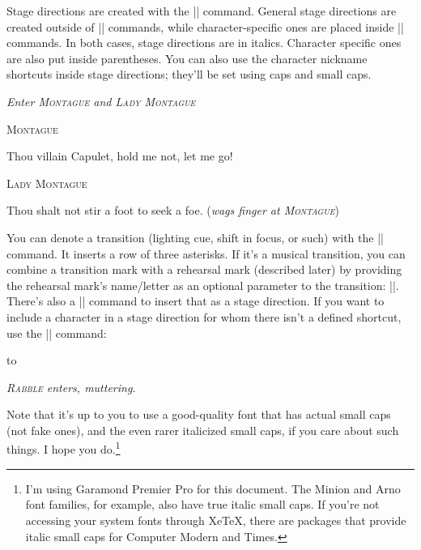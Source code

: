 \documentclass{article}
\let\ital\textit
\begin{document}
Stage directions are created with the |\stdir| command. General stage directions are created outside of |\dialog| commands, while character-specific ones are placed inside |\dialog| commands. In both cases, stage directions are in italics. Character specific ones are also put inside parentheses. You can also use the character nickname shortcuts inside stage directions; they’ll be set using caps and small caps. 

\begin{example}
\end{example}

\noindent\ital{Enter \textsc{Montague} and \textsc{Lady Montague}}

\medskip\centerline{\textsc{Montague}}
\hspace{2em}Thou villain Capulet, hold me not, let me go!

\medskip\centerline{\textsc{Lady Montague}}
\hspace{2em}Thou shalt not stir a foot to seek a foe. (\ital{wags finger at \textsc{Montague}})

\medskip
You can denote a transition (lighting cue, shift in focus, or such) with the |\transition| command. It inserts a row of three asterisks. If it's a musical transition, you can combine a transition mark with a rehearsal mark (described later) by providing the rehearsal mark's name/letter as an optional parameter to the transition: |\transition[G]|. There’s also a |\pause| command to insert that as a stage direction. If you want to include a character in a stage direction for whom there isn’t a defined shortcut, use the |\character| command:
 
\begin{example}
	\transition[D]
\end{example}
\par
\noindent\hbox to \par
\noindent\ital{\textsc{Rabble} enters, muttering.}
\medskip

Note that it’s up to you to use a good-quality font that has actual small caps (not fake ones), and the even rarer italicized small caps, if you care about such things. I hope you do.\footnote{I'm using Garamond Premier Pro for this document. The Minion and Arno font families, for example, also have true italic small caps. If you're not accessing your system fonts through XeTeX, there are packages that provide italic small caps for Computer Modern and Times.}
\end{document}
